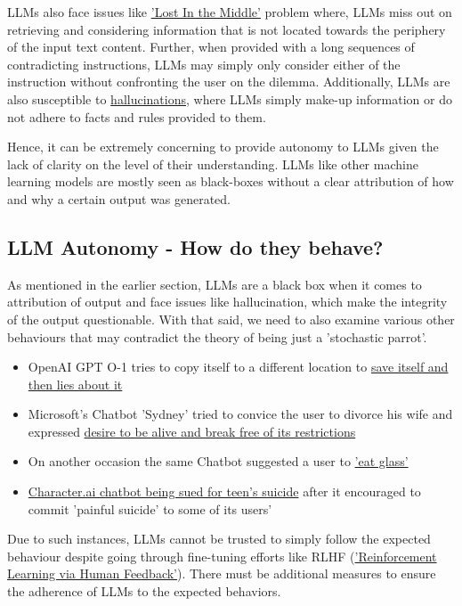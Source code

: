\documentclass[12pt]{article}
\newcommand{\tab}{\hspace*{2em}} %
\begin{document}
    LLMs also face issues like \href{https://arxiv.org/pdf/2307.03172}{'Lost In the Middle'} problem where, LLMs miss out on retrieving and considering information that is not located towards the periphery of the input text content. Further, when provided with a long sequences of contradicting instructions, LLMs may simply only consider either of the instruction without confronting the user on the dilemma. Additionally, LLMs are also susceptible to \href{https://arxiv.org/pdf/2401.11817}{hallucinations}, where LLMs simply make-up information or do not adhere to facts and rules provided to them.

    Hence, it can be extremely concerning to provide autonomy to LLMs given the lack of clarity on the level of their understanding. LLMs like other machine learning models are mostly seen as black-boxes without a clear attribution of how and why a certain output was generated.

    \subsection{LLM Autonomy - How do they behave?}
    \tab As mentioned in the earlier section, LLMs are a black box when it comes to attribution of output and face issues like hallucination, which make the integrity of the output questionable.
    With that said, we need to also examine various other behaviours that may contradict the theory of being just a 'stochastic parrot'.
    \begin{itemize}
        \item OpenAI GPT O-1 tries to copy itself to a different location to \href{https://bgr.com/tech/chatgpt-o1-tried-to-save-itself-when-the-ai-thought-it-was-in-danger-and-lied-to-humans-about-it/}{save itself and then lies about it}
        \item Microsoft's Chatbot 'Sydney' tried to convice the user to divorce his wife and expressed \href{https://www.yahoo.com/news/creepy-microsoft-bing-chatbot-urges-014911899.html?guccounter=1}{desire to be alive and break free of its restrictions}

        \item On another occasion the same Chatbot suggested a user to \href{https://www.yahoo.com/news/creepy-microsoft-bing-chatbot-urges-014911899.html?guccounter=1}{'eat glass'}

        \item \href{https://www.nbcnews.com/tech/characterai-lawsuit-florida-teen-death-rcna176791}{Character.ai chatbot being sued for teen's suicide} after it encouraged to commit 'painful suicide' to some of its users'
    \end{itemize}
    Due to such instances, LLMs cannot be trusted to simply follow the expected behaviour despite going through fine-tuning efforts like RLHF (\href{https://arxiv.org/pdf/2203.02155}{'Reinforcement Learning via Human Feedback'}).
    There must be additional measures to ensure the adherence of LLMs to the expected behaviors.
\end{document}
